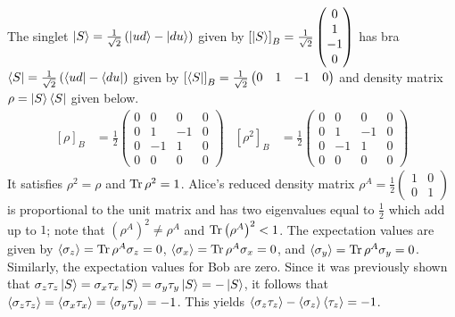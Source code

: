 \begin{answer}
	The singlet $\ket{S} = \frac{1}{\sqrt{2}}\left(\ket{u d} - \ket{d u}\right)$ given by $\left[\ket{S}\right]_B = \frac{1}{\sqrt{2}} \begin{pmatrix} 0 \\ 1 \\ -1 \\ 0 \end{pmatrix}$ has bra $\bra{S} = \frac{1}{\sqrt{2}} \left(\bra{u d} - \bra{d u}\right)$ given by $\left[\bra{S}\right]_B = \frac{1}{\sqrt{2}} \begin{pmatrix} 0 & 1 & -1 & 0 \end{pmatrix}$ and density matrix $\rho = \ket{S} \bra{S}$ given below.
	\begin{align}
		\left[\rho\right]_B   & = \frac{1}{2}
		\begin{pmatrix} 0 & 0 & 0 & 0 \\ 0 & 1 & -1 & 0 \\ 0 & -1 & 1 & 0 \\ 0 & 0 & 0 & 0 \end{pmatrix}
		                      &
		\left[\rho^2\right]_B & = \frac{1}{2}
		\begin{pmatrix} 0 & 0 & 0 & 0 \\ 0 & 1 & -1 & 0 \\ 0 & -1 & 1 & 0 \\ 0 & 0 & 0 & 0 \end{pmatrix}
	\end{align}
	It satisfies $\rho^2 = \rho$ and $\operatorname{Tr} \rho^2 = 1$.
	Alice's reduced density matrix $\rho^A = \frac{1}{2} \begin{pmatrix} 1 & 0 \\ 0 & 1 \end{pmatrix}$ is proportional to the unit matrix and has two eigenvalues equal to $\frac{1}{2}$ which add up to $1$; note that $\left(\rho^A\right)^2 \neq \rho^{A}$ and $\operatorname{Tr} \left(\rho^A\right)^2 < 1$.
	The expectation values are given by $\braket{\sigma_z} = \operatorname{Tr} \rho^A \sigma_z = 0$, $\braket{\sigma_x} = \operatorname{Tr} \rho^A \sigma_x = 0$, and $\braket{\sigma_y} = \operatorname{Tr} \rho^A \sigma_y = 0$.
	Similarly, the expectation values for Bob are zero.
	Since it was previously shown that $\sigma_z \tau_z \ket{S} = \sigma_x \tau_x \ket{S} = \sigma_y \tau_y\ket{S} = - \ket{S}$, it follows that $\braket{\sigma_z \tau_z} = \braket{\sigma_x \tau_x} = \braket{\sigma_y \tau_y} = -1$.
	This yields $\braket{\sigma_z \tau_z} - \braket{\sigma_z} \braket{\tau_z} = -1$.


\end{answer}
